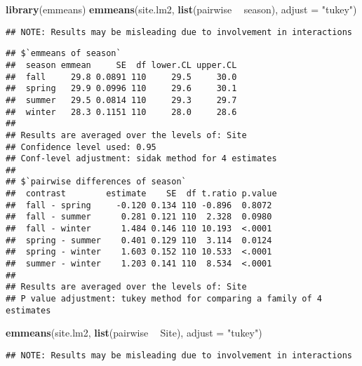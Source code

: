 \documentclass[
]{article}
\newenvironment{Shaded}{\begin{snugshade}}{\end{snugshade}}
\newcommand{\DataTypeTok}[1]{\textcolor[rgb]{0.13,0.29,0.53}{#1}}
\newcommand{\KeywordTok}[1]{\textcolor[rgb]{0.13,0.29,0.53}{\textbf{#1}}}
\newcommand{\NormalTok}[1]{#1}
\newcommand{\OperatorTok}[1]{\textcolor[rgb]{0.81,0.36,0.00}{\textbf{#1}}}
\newcommand{\StringTok}[1]{\textcolor[rgb]{0.31,0.60,0.02}{#1}}
\begin{document}
\begin{Shaded}
\begin{Highlighting}[]
\KeywordTok{library}\NormalTok{(emmeans)}
\KeywordTok{emmeans}\NormalTok{(site.lm2, }\KeywordTok{list}\NormalTok{(pairwise }\OperatorTok{~}\StringTok{ }\NormalTok{season), }\DataTypeTok{adjust =} \StringTok{"tukey"}\NormalTok{)}
\end{Highlighting}
\end{Shaded}

\begin{verbatim}
## NOTE: Results may be misleading due to involvement in interactions
\end{verbatim}

\begin{verbatim}
## $`emmeans of season`
##  season emmean     SE  df lower.CL upper.CL
##  fall     29.8 0.0891 110     29.5     30.0
##  spring   29.9 0.0996 110     29.6     30.1
##  summer   29.5 0.0814 110     29.3     29.7
##  winter   28.3 0.1151 110     28.0     28.6
## 
## Results are averaged over the levels of: Site 
## Confidence level used: 0.95 
## Conf-level adjustment: sidak method for 4 estimates 
## 
## $`pairwise differences of season`
##  contrast        estimate    SE  df t.ratio p.value
##  fall - spring     -0.120 0.134 110 -0.896  0.8072 
##  fall - summer      0.281 0.121 110  2.328  0.0980 
##  fall - winter      1.484 0.146 110 10.193  <.0001 
##  spring - summer    0.401 0.129 110  3.114  0.0124 
##  spring - winter    1.603 0.152 110 10.533  <.0001 
##  summer - winter    1.203 0.141 110  8.534  <.0001 
## 
## Results are averaged over the levels of: Site 
## P value adjustment: tukey method for comparing a family of 4 estimates
\end{verbatim}

\begin{Shaded}
\begin{Highlighting}[]
\KeywordTok{emmeans}\NormalTok{(site.lm2, }\KeywordTok{list}\NormalTok{(pairwise }\OperatorTok{~}\StringTok{ }\NormalTok{Site), }\DataTypeTok{adjust =} \StringTok{"tukey"}\NormalTok{)}
\end{Highlighting}
\end{Shaded}

\begin{verbatim}
## NOTE: Results may be misleading due to involvement in interactions
\end{verbatim}
\end{document}
